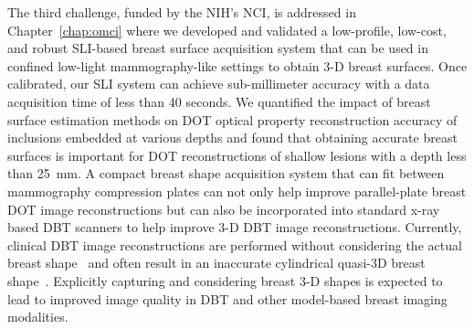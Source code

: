The third challenge, funded by the \ac{NIH}'s \ac{NCI}, is addressed in Chapter~\ref{chap:omci} where we developed and validated a low-profile, low-cost, and robust \ac{SLI}-based breast surface acquisition system that can be used in confined low-light mammography-like settings to obtain 3-D breast surfaces. Once calibrated, our \ac{SLI} system can achieve sub-millimeter accuracy with a data acquisition time of less than 40 seconds. We quantified the impact of breast surface estimation methods on \ac{DOT} optical property reconstruction accuracy of inclusions embedded at various depths and found that obtaining accurate breast surfaces is important for \ac{DOT} reconstructions of shallow lesions with a depth less than 25~mm. A compact breast shape acquisition system that can fit between mammography compression plates can not only help improve parallel-plate breast \ac{DOT} image reconstructions but can also be incorporated into standard x-ray based \ac{DBT} scanners to help improve 3-D \ac{DBT} image reconstructions. Currently, clinical \ac{DBT} image reconstructions are performed without considering the actual breast shape~\cite{Chong2019} and often result in an inaccurate cylindrical quasi-3D breast shape~\cite{Redbird2008}. Explicitly capturing and considering breast 3-D shapes is expected to lead to improved image quality in \ac{DBT} and other model-based breast imaging modalities.

